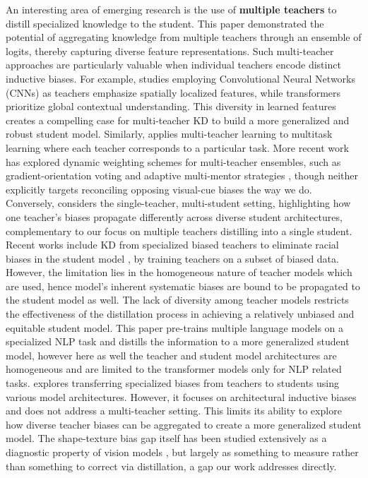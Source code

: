 \documentclass{article}
\begin{document}
An interesting area of emerging research is the use of \textbf{multiple teachers} to distill specialized knowledge to the student. This paper \cite{you2017learning} demonstrated the potential of aggregating knowledge from multiple teachers through an ensemble of logits, thereby capturing diverse feature representations. Such multi-teacher approaches are particularly valuable when individual teachers encode distinct inductive biases. For example, studies \cite{abnar2020transferring} employing Convolutional Neural Networks (CNNs) as teachers emphasize spatially localized features, while transformers prioritize global contextual understanding. This diversity in learned features creates a compelling case for multi-teacher KD to build a more generalized and robust student model. Similarly, \cite{tan2019multilingual} applies multi-teacher learning to multitask learning where each teacher corresponds to a particular task. More recent work has explored dynamic weighting schemes for multi-teacher ensembles, such as gradient-orientation voting \cite{zhou2024govern} and adaptive multi-mentor strategies \cite{sarode2024classroomkd}, though neither explicitly targets reconciling opposing visual-cue biases the way we do. Conversely, \cite{you2018learning} considers the single-teacher, multi-student setting, highlighting how one teacher's biases propagate differently across diverse student architectures, complementary to our focus on multiple teachers distilling into a single student. \\

Recent works include KD from specialized biased teachers to eliminate racial biases in the student model \cite{caldeira2024mst}, by training teachers on a subset of biased data. However, the limitation lies in the homogeneous nature of teacher models which are used, hence model's inherent systematic biases are bound to be propagated to the student model as well. The lack of diversity among teacher models restricts the effectiveness of the distillation process in achieving a relatively unbiased and equitable student model. This paper \cite{wu2021one} pre-trains multiple language models on a specialized NLP task and distills the information to a more generalized student model, however here as well the teacher and student model architectures are homogeneous and are limited to the transformer models only for NLP related tasks. \cite{abnar2020transferring} explores transferring specialized biases from teachers to students using various model architectures. However, it focuses on architectural inductive biases and does not address a multi-teacher setting. This limits its ability to explore how diverse teacher biases can be aggregated to create a more generalized student model. The shape-texture bias gap itself has been studied extensively as a diagnostic property of vision models \cite{geirhos2018imagenet, tartaglini2022developmentally}, but largely as something to measure rather than something to correct via distillation, a gap our work addresses directly. \\
\end{document}
